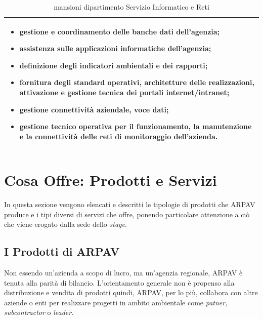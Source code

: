 \begin{table}[htbp]
\centering
\begin{tabular}{|p{}|}
\hline

\begin{itemize}

    \item gestione e coordinamento delle banche dati dell'agenzia;
	
	\item assistenza sulle applicazioni informatiche dell'agenzia;
	
	\item definizione degli indicatori ambientali e dei rapporti;
	
	\item fornitura degli standard operativi, architetture delle realizzazioni, attivazione e gestione tecnica dei portali internet/intranet;
	
	\item gestione connettività aziendale, voce dati;
	
	\item gestione tecnico operativa per il funzionamento, la manutenzione e la connettività delle reti di monitoraggio dell'azienda.
\end{itemize}
	\\
	
\hline
\end{tabular}
\caption{mansioni dipartimento Servizio Informatico e Reti}
\end{table}

\section{Cosa Offre: Prodotti e Servizi}

In questa sezione vengono elencati e descritti le tipologie di prodotti che ARPAV produce e i tipi diversi di servizi che offre, ponendo particolare attenzione a ciò che viene erogato dalla sede dello \textit{stage}.

\subsection{I Prodotti di ARPAV}

Non essendo un'azienda a scopo di lucro, ma un'agenzia regionale, ARPAV è tenuta alla parità di bilancio. L'orientamento generale non è propenso alla distribuzione e vendita di prodotti quindi, ARPAV, per lo più, collabora con altre aziende o enti per realizzare progetti in ambito ambientale come \textit{patner, subcontractor} o \textit{leader}.



